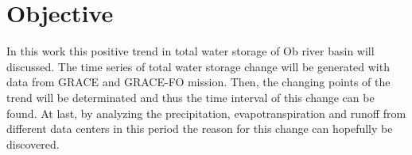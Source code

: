 \section{Objective}
In this work this positive trend in total water storage of Ob river basin will discussed. The time series of total water storage change will be generated with data from GRACE and GRACE-FO mission. Then, the changing points of the trend will be determinated and thus the time interval of this change can be found. At last, by analyzing the precipitation, evapotranspiration and runoff from different data centers in this period
 the reason for this change can hopefully be discovered. 


